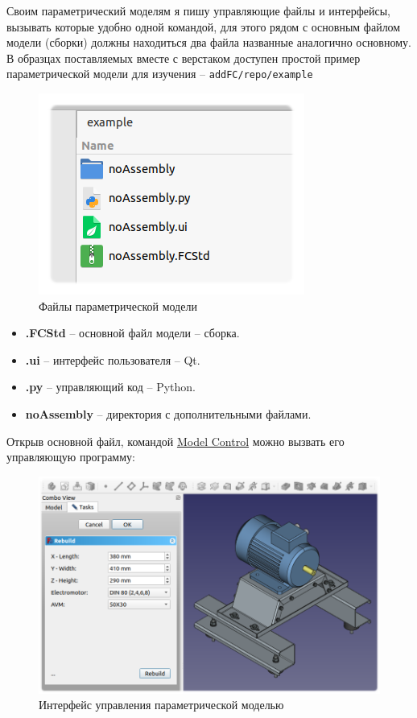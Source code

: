 \documentclass[a4paper,12pt]{article}
\begin{document}
Своим параметрический моделям я пишу управляющие файлы и интерфейсы, вызывать которые удобно одной командой, для этого рядом с основным файлом модели (сборки) должны находиться два файла названные аналогично основному.\\

В образцах поставляемых вместе с верстаком доступен простой пример параметрической модели для изучения -- \verb|addFC/repo/example|

\begin{figure}[htp]
	\centering
	\includegraphics[scale=1]{img/example.png}
	\caption{Файлы параметрической модели}
	\label{sec:example}
	\end{figure}

\begin{itemize}
	\item \textbf{.FCStd} -- основной файл модели -- сборка.
	\item \textbf{.ui} -- интерфейс пользователя -- Qt.
	\item \textbf{.py} -- управляющий код -- Python.
	\item \textbf{noAssembly} -- директория с дополнительными файлами.
\end{itemize}

\pagebreak


\begin{flushleft}Открыв основной файл, командой \hyperref[sec:3]{Model Control} можно вызвать его управляющую программу:\end{flushleft}

\begin{figure}[htp]
	\centering
	\includegraphics[width=1\textwidth]{img/example_mc.png}
	\caption{Интерфейс управления параметрической моделью}
	\label{sec:example_mc}
\end{figure}
\end{document}
